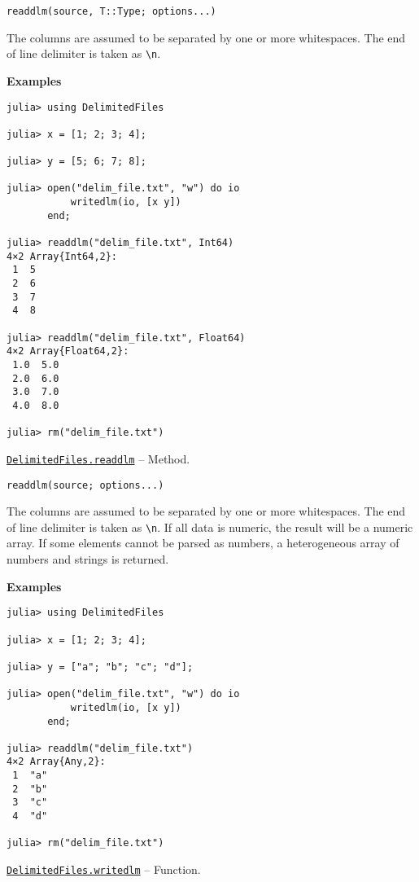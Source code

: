 \begin{adjustwidth}{2em}{0pt}


\begin{verbatim}
readdlm(source, T::Type; options...)
\end{verbatim}

The columns are assumed to be separated by one or more whitespaces. The end of line delimiter is taken as \texttt{{\textbackslash}n}.

\textbf{Examples}


\begin{verbatim}
julia> using DelimitedFiles

julia> x = [1; 2; 3; 4];

julia> y = [5; 6; 7; 8];

julia> open("delim_file.txt", "w") do io
           writedlm(io, [x y])
       end;

julia> readdlm("delim_file.txt", Int64)
4×2 Array{Int64,2}:
 1  5
 2  6
 3  7
 4  8

julia> readdlm("delim_file.txt", Float64)
4×2 Array{Float64,2}:
 1.0  5.0
 2.0  6.0
 3.0  7.0
 4.0  8.0

julia> rm("delim_file.txt")
\end{verbatim}



\end{adjustwidth}
\hypertarget{12553768345033130217}{} 
\hyperlink{12553768345033130217}{\texttt{DelimitedFiles.readdlm}}  -- {Method.}

\begin{adjustwidth}{2em}{0pt}


\begin{verbatim}
readdlm(source; options...)
\end{verbatim}

The columns are assumed to be separated by one or more whitespaces. The end of line delimiter is taken as \texttt{{\textbackslash}n}. If all data is numeric, the result will be a numeric array. If some elements cannot be parsed as numbers, a heterogeneous array of numbers and strings is returned.

\textbf{Examples}


\begin{verbatim}
julia> using DelimitedFiles

julia> x = [1; 2; 3; 4];

julia> y = ["a"; "b"; "c"; "d"];

julia> open("delim_file.txt", "w") do io
           writedlm(io, [x y])
       end;

julia> readdlm("delim_file.txt")
4×2 Array{Any,2}:
 1  "a"
 2  "b"
 3  "c"
 4  "d"

julia> rm("delim_file.txt")
\end{verbatim}



\end{adjustwidth}
\hypertarget{18287165101716314167}{} 
\hyperlink{18287165101716314167}{\texttt{DelimitedFiles.writedlm}}  -- {Function.}


